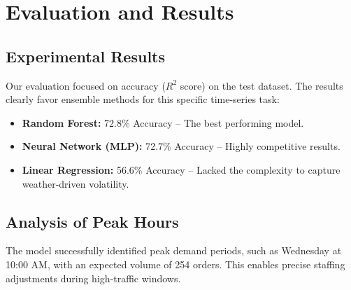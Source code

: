 \chapter{Evaluation and Results}
\label{sec:concepts}

\section{Experimental Results}
Our evaluation focused on accuracy ($R^2$ score) on the test dataset. The results clearly favor ensemble methods for this specific time-series task:
\begin{itemize}
    \item \textbf{Random Forest:} 72.8\% Accuracy – The best performing model.
    \item \textbf{Neural Network (MLP):} 72.7\% Accuracy – Highly competitive results.
    \item \textbf{Linear Regression:} 56.6\% Accuracy – Lacked the complexity to capture weather-driven volatility.
\end{itemize}

\section{Analysis of Peak Hours}
The model successfully identified peak demand periods, such as Wednesday at 10:00 AM, with an expected volume of 254 orders. This enables precise staffing adjustments during high-traffic windows.